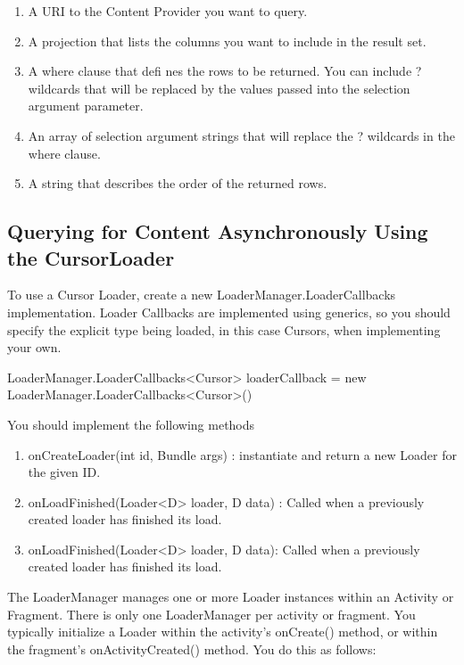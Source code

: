 \begin{enumerate}
	\item A URI to the Content Provider you want to query.
	\item A projection that lists the columns you want to include in the result set.
	\item A where clause that defi nes the rows to be returned. You can include ? wildcards that will be replaced by the values passed into the selection argument parameter.
	\item An array of selection argument strings that will replace the ? wildcards in the where clause.
	\item A string that describes the order of the returned rows.
\end{enumerate}

\subsection{Querying for Content Asynchronously Using the CursorLoader}
To use a Cursor Loader, create a new LoaderManager.LoaderCallbacks implementation. Loader Callbacks are implemented using generics, so you should specify the explicit type being loaded, in this case Cursors, when implementing your own.

\begin{android}
LoaderManager.LoaderCallbacks<Cursor> loaderCallback = new LoaderManager.LoaderCallbacks<Cursor>() 
\end{android}

You should implement the following methods

\begin{enumerate}
	\item onCreateLoader(int id, Bundle args) : instantiate and return a new Loader for the given ID.
	\item onLoadFinished(Loader<D> loader, D data) : Called when a previously created loader has finished its load.
	\item onLoadFinished(Loader<D> loader, D data): Called when a previously created loader has finished its load.
\end{enumerate}

The LoaderManager manages one or more Loader instances within an Activity or Fragment. There is only one LoaderManager per activity or fragment. You typically initialize a Loader within the activity's onCreate() method, or within the fragment's onActivityCreated() method. You do this as follows:

